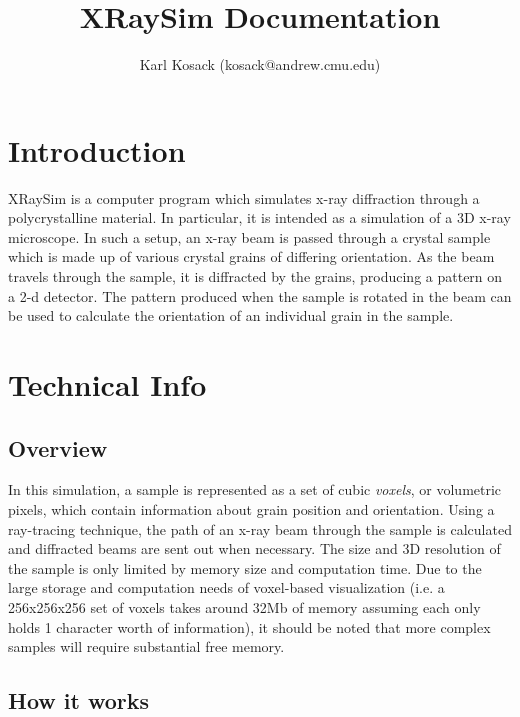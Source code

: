 \documentclass{article}
\begin{document}
	\pagestyle{plain}

	\title{XRaySim Documentation}
	\author{Karl Kosack (kosack@andrew.cmu.edu)}
	\maketitle

	\tableofcontents
	\newpage

\section{Introduction}

XRaySim is a computer program which simulates x-ray diffraction
through a polycrystalline material. In particular, it is intended as a
simulation of a 3D x-ray microscope.  In such a setup, an x-ray beam
is passed through a crystal sample which is made up of various crystal
grains of differing orientation. As the beam travels through the
sample, it is diffracted by the grains, producing a pattern on a 2-d
detector.  The pattern produced when the sample is rotated in the beam
can be used to calculate the orientation of an individual grain in the
sample. 

\section{Technical Info}

\subsection{Overview}

In this simulation, a sample is represented as a set of cubic {\em
voxels}, or volumetric pixels, which contain information about grain
position and orientation. Using a ray-tracing technique, the path of
an x-ray beam through the sample is calculated and diffracted beams
are sent out when necessary. The size and 3D resolution of the sample
is only limited by memory size and computation time.  Due to the large
storage and computation needs of voxel-based visualization (i.e. a
256x256x256 set of voxels takes around 32Mb of memory assuming each
only holds 1 character worth of information), it should be noted that
more complex samples will require substantial free memory.

\subsection{How it works}
\end{document}
